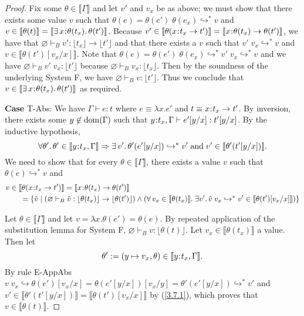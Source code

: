 \documentclass[11pt]{article}
\newcommand{\bind}{\hspace{0.05em}{:}\hspace{0.05em}} %
\newcommand{\lb}{\llbracket}         %
\newcommand{\rb}{\rrbracket}         %
\newcommand{\step}{\hookrightarrow}
\newcommand{\many}{\hookrightarrow^*}
\newcommand{\existype}[3]{\exists\, #1\bind #2.\, #3}
\newcommand{\functype}[3]{#1\bind #2 \rightarrow #3}
\newcommand{\dom}[1]{{\rm dom}(#1)}
\begin{document}
\begin{proof}
Fix some $\theta \in \lb\Gamma \rb$ and let $v'$ and $v_x$ be as above; we must show that there exists some value $v$ such that $\theta(e) = \theta(e')\; \theta(e_x) \many v$ and $v \in \lb\theta(t)\rb = \lb\existype{x}{\theta(t_x)}{\theta(t')}\rb$. 
Because $v' \in \lb\theta(\functype{x}{t_x}{t'})\rb =\lb\functype{x}{\theta(t_x)}{\theta(t')}\rb$, we have that $\varnothing \vdash_B v' : \lfloor t_x\rfloor \rightarrow \lfloor t'\rfloor$ and that there exists a $v$ such that $v'\; v_x \many v$ and $v \in \lb \theta(t')[v_x/x]\rb$. Note that $\theta(e) = \theta(e')\; \theta(e_x) \many v'\; v_x \many v$ and we have $\varnothing \vdash_B v'\; v_x : \lfloor t' \rfloor$ because $\varnothing \vdash_B v_x:\lfloor t_x\rfloor$. Then by the soundness of the underlying System F, we have $\varnothing \vdash_B v : \lfloor t' \rfloor$. Thus we conclude that $v \in \lb \existype{x}{\theta(t_x)}{\theta(t')}\rb$ as required.

{\bf Case} {\sc T-Abs}: We have $\Gamma \vdash e : t$ where $e \equiv \lambda x.e'$ and $t \equiv \functype{x}{t_x}{t'}$. By inversion, there exists some $y\not\in\dom{\Gamma}$ such that $y\bind t_x, \Gamma \vdash e'[y/x] : t'[y/x]$. By the inductive hypothesis,
\begin{equation}\label{3.7.1}
\forall\theta'.\, \theta' \in \lb y\bind t_x,\Gamma\rb \Rightarrow \exists\, v'.\, \theta'(e'[y/x]) \many v' \;{\rm and}\; v' \in \lb\theta'(t'[y/x])\rb.\end{equation}
We need to show that for every $\theta \in \lb\Gamma\rb$, there exists a value $v$ such that $\theta(e) \many v$ and 
\begin{align*}
v \in \lb \theta(&\functype{x}{t_x}{t'}) \rb = \lb \functype{x}{\theta(t_x)}{\theta(t')}\rb\\
=&\; \{ \hat{v} \;|\; (\varnothing \vdash_B {\hat v} : \lfloor \theta(t_x) \rfloor \rightarrow \lfloor \theta(t') \rfloor) \wedge ( \forall\, v_x \in \lb \theta(t_x) \rb.\; \exists v'.\,\hat v \; v_x \many v' \in \lb\theta(t')[v_x/x] \rb) \}
\end{align*}

Let $\theta \in \lb\Gamma\rb$ and let $v = \lambda x.\theta(e') = \theta(e)$. By repeated application of the substitution lemma for System F, $\varnothing \vdash_B v : \lfloor \theta(t) \rfloor$.
Let $v_x \in \lb \theta(t_x)\rb$ a value.  Then let
\[\theta' := (y\mapsto v_x, \theta) \in \lb y\bind t_x,\Gamma\rb.\] 
By rule {\sc E-AppAbs} $v\; v_x \step \theta(e')[v_x/x] = \theta(e'[y/x])[v_x/y] = \theta'(e'[y/x]) \many v'$ and $v' \in \lb\theta'(t'[y/x])\rb = \lb \theta(t')[v_x/x]\rb$ by (\ref{3.7.1}), which proves that $v \in \lb\theta(t)\rb$.


\end{proof}
\end{document}
